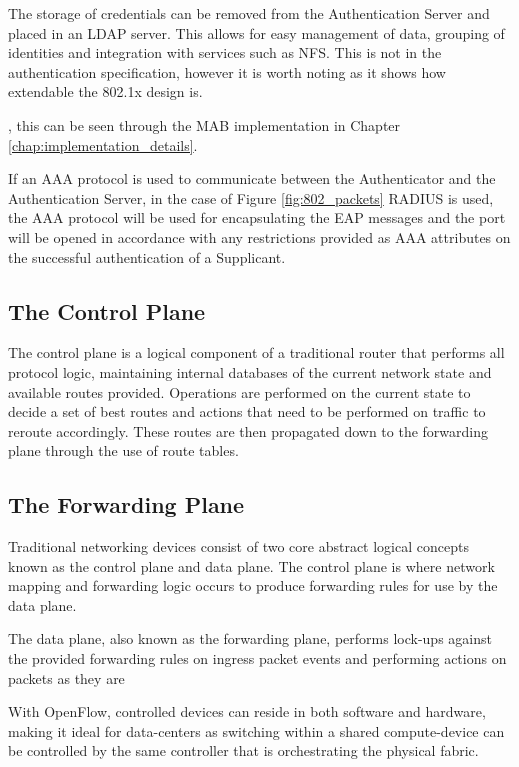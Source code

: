 


The storage of credentials can be removed from the Authentication Server and placed in an LDAP server. This allows for easy management of data, grouping of identities and integration with services such as NFS. This is not in the authentication specification, however it is worth noting as it shows how extendable the 802.1x design is.


, this can be seen through the MAB implementation in Chapter \ref{chap:implementation_details}.




If an AAA protocol is used to communicate between the Authenticator and the Authentication Server, in the case of Figure \ref{fig:802_packets} RADIUS is used, the AAA protocol will be used for encapsulating the EAP messages and the port will be opened in accordance with any restrictions provided as AAA attributes on the successful authentication of a Supplicant.



\subsection{The Control Plane}
The control plane is a logical component of a traditional router that performs all protocol logic, maintaining internal databases of the current network state and available routes provided. Operations are performed on the current state to decide a set of best routes and actions that need to be performed on traffic to reroute accordingly. These routes are then propagated down to the forwarding plane through the use of route tables. \cite{control_plane_tech_target}

\subsection{The Forwarding Plane}

Traditional networking devices consist of two core abstract logical concepts known as the control plane and data plane. The control plane is where network mapping and forwarding logic occurs to produce forwarding rules for use by the data plane. 

The data plane, also known as the forwarding plane, performs lock-ups against the provided forwarding rules on ingress packet events and performing actions on packets as they are





With OpenFlow, controlled devices can reside in both software and hardware, making it ideal for data-centers as switching within a shared compute-device can be controlled by the same controller that is orchestrating the physical fabric.\cite{cisco_open_flow}\cite{openvswitch}